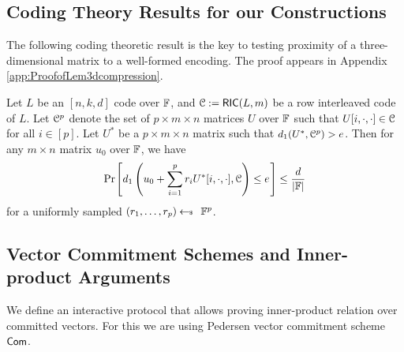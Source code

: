 \subsection{Coding Theory Results for our Constructions}\label{new_result_coding_theory}
The following coding theoretic result is the key to testing proximity of a three-dimensional matrix to a well-formed encoding. The proof  appears in Appendix \ref{app:ProofofLem3dcompression}.
\begin{proposition}[3D Compression]\label{lem:3dcompression}
	Let $L$ be an $[n,k,d]$ code over $\FF$, and $\mc{C} :=
	\ric{L}{m}$ be a row interleaved code of $L$. Let $\mc{C}^p$ denote the set of
	$p\times m\times n$ matrices $U$ over $\FF$ such that $U[i,\cdot,\cdot]\in
	\mc{C}$ for all $i\in [p]$. Let $U^\ast$ be a
	$p\times m\times n$ matrix such that $d_1(U^\ast,\mc{C}^p)>e$.  Then for any
	$m\times n$ matrix $u_0$ over $\FF$, we have 
	\[ \prob{d_1\left(u_0 + \sum_{i=1}^p r_iU^\ast[i,\cdot,\cdot], \mc{C}\right)\leq e}\leq
	\frac{d}{|\FF|}\]  
	for a uniformly sampled $(r_1,\ldots,r_p)\sample \FF^p$. 
\end{proposition}

\subsection{Vector Commitment Schemes and Inner-product Arguments}
We define an interactive protocol that allows proving inner-product relation over committed vectors. For this we are using Pedersen vector commitment scheme $\comm$.

